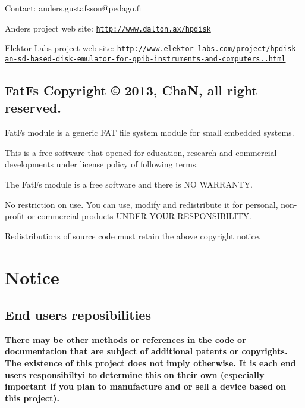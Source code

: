 Contact\-: anders.\-gustafsson@pedago.\-fi\par
 Anders project web site\-: \href{http://www.dalton.ax/hpdisk}{\tt http\-://www.\-dalton.\-ax/hpdisk}\par
 Elektor Labs project web site\-: \href{http://www.elektor-labs.com/project/hpdisk-an-sd-based-disk-emulator-for-gpib-instruments-and-computers.13693.html}{\tt http\-://www.\-elektor-\/labs.\-com/project/hpdisk-\/an-\/sd-\/based-\/disk-\/emulator-\/for-\/gpib-\/instruments-\/and-\/computers..\-html}





\subsection*{Fat\-Fs Copyright \copyright{} 2013, Cha\-N, all right reserved.}

Fat\-Fs module is a generic F\-A\-T file system module for small embedded systems.

This is a free software that opened for education, research and commercial developments under license policy of following terms.


\begin{DoxyItemize}
\item The Fat\-Fs module is a free software and there is N\-O W\-A\-R\-R\-A\-N\-T\-Y.
\item No restriction on use. You can use, modify and redistribute it for personal, non-\/profit or commercial products U\-N\-D\-E\-R Y\-O\-U\-R R\-E\-S\-P\-O\-N\-S\-I\-B\-I\-L\-I\-T\-Y.
\item Redistributions of source code must retain the above copyright notice.
\end{DoxyItemize}





\section*{Notice}

\subsection*{End users reposibilities}

{\bfseries There may be other methods or references in the code or documentation that are subject of additional patents or copyrights. The existence of this project does not imply otherwise. It is each end users responsibiltyi to determine this on their own (especially important if you plan to manufacture and or sell a device based on this project).} 